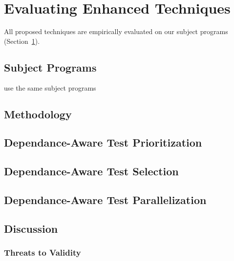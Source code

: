 
\section{Evaluating Enhanced Techniques}
\label{sec:evaluation}

All proposed techniques are empirically evaluated on
our subject programs (Section~\ref{sec:evaluation}).

\subsection{Subject Programs}

use the same subject programs

\subsection{Methodology}


\subsection{Dependance-Aware Test Prioritization}

\subsection{Dependance-Aware Test Selection}

\subsection{Dependance-Aware Test Parallelization}


\subsection{Discussion}

\subsubsection{Threats to Validity}

